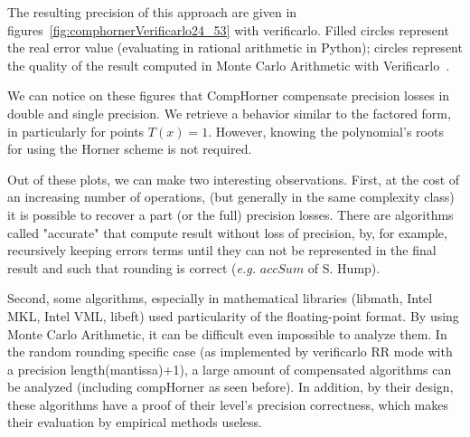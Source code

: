 The resulting precision of this approach are given in figures~\ref{fig:comphornerVerificarlo24_53} with verificarlo. 
Filled circles represent the real error value (evaluating in rational arithmetic in Python); circles represent the quality of the result computed in Monte Carlo Arithmetic with Verificarlo~\cite{verrou}.

We can notice on these figures that CompHorner compensate precision losses in double and single precision. We retrieve a behavior similar to the factored form, in particularly for points $T(x)=1$. However, knowing the polynomial's roots for using the Horner scheme is not required.

Out of these plots, we can make two interesting observations.
First, at the cost of an increasing number of operations, (but generally in the same complexity class) it is possible to recover a part (or the full) precision losses. There are algorithms called "accurate" that compute result without loss of precision, by, for example, recursively keeping errors terms until they can not be represented in the final result and such that rounding is correct ({\it e.g.} $accSum$ of S. Hump).

Second, some algorithms, especially in mathematical libraries (libmath, Intel MKL, Intel VML, libeft) used particularity of the floating-point format. By using Monte Carlo Arithmetic, it can be difficult even impossible to analyze them. In the random rounding specific case (as implemented by verificarlo RR mode with a precision length(mantissa)+1), a large amount of compensated algorithms can be analyzed (including compHorner as seen before). In addition, by their design, these algorithms have a proof of their level's precision correctness, which makes their evaluation by empirical methods useless.


